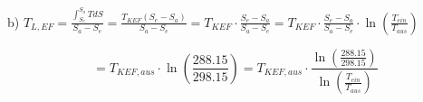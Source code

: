 b) $T_{L,EF} = \frac{\int_{S_e}^{S_a} T dS}{S_a - S_e} = \frac{T_{KEF} (S_e - S_a)}{S_a - S_e} = T_{KEF} \cdot \frac{S_e - S_a}{S_a - S_e} = T_{KEF} \cdot \frac{S_e - S_a}{S_a - S_e} \cdot \ln \left( \frac{T_{ein}}{T_{aus}} \right)$

\[
= T_{KEF,aus} \cdot \ln \left( \frac{288.15}{298.15} \right) = T_{KEF,aus} \cdot \frac{\ln \left( \frac{288.15}{298.15} \right)}{\ln \left( \frac{T_{ein}}{T_{aus}} \right)}
\]
